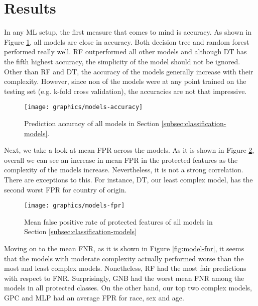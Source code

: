 \section{Results} \label{sec:results}
In any ML setup, the first measure that comes to mind is accuracy. As shown in Figure \ref{fig:model-accuracy}, all models are close in accuracy. Both decision tree and random forest performed really well. RF outperformed all other models and although DT has the fifth highest accuracy, the simplicity of the model should not be ignored. Other than RF and DT, the accuracy of the models generally increase with their complexity. However, since non of the models were at any point trained on the testing set (e.g. k-fold cross validation), the accuracies are not that impressive.

\begin{figure}
	\begin{center}
    	\centering
        \texttt{[image: graphics/models-accuracy]}
        \caption{Prediction accuracy of all models in Section \ref{subsec:classification-models}.}
        \label{fig:model-accuracy}
     \end{center}
\end{figure}

Next, we take a look at mean FPR across the models. As it is shown in Figure \ref{fig:model-fpr}, overall we can see an increase in mean FPR in the protected features as the complexity of the models increase. Nevertheless, it is not a strong correlation. There are exceptions to this. For instance, DT, our least complex model, has the second worst FPR for country of origin.

\begin{figure}
	\begin{center}
    	\centering
        \texttt{[image: graphics/models-fpr]}
        \caption{Mean false positive rate of protected features of all models in Section \ref{subsec:classification-models}}
        \label{fig:model-fpr}
     \end{center}
\end{figure}

Moving on to the mean FNR, as it is shown in Figure \ref{fig:model-fnr}, it seems that the models with moderate complexity actually performed worse than the most and least complex models. Nonetheless, RF had the most fair predictions with respect to FNR. Surprisingly, GNB had the worst mean FNR among the models in all protected classes. On the other hand, our top two complex models, GPC and MLP had an average FPR for race, sex and age.

